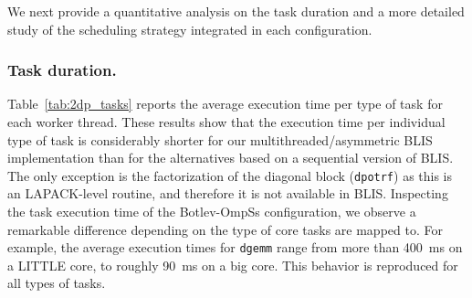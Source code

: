 We next provide a quantitative analysis on the task duration and a more detailed study of 
the scheduling strategy integrated in each configuration.

\subsubsection{Task duration.}
 
Table~\ref{tab:2dp_tasks} reports the average execution time per type of task for each worker thread.
These results show that the execution time per individual type of task is considerably shorter
for our multithreaded/asymmetric BLIS implementation than for the alternatives based on a sequential
version of BLIS. The only exception is the factorization of the diagonal block ({\tt dpotrf}) as this is
an LAPACK-level routine, and therefore it is not available in BLIS. Inspecting the task execution time of
the Botlev-OmpSs configuration, we observe a remarkable difference depending
on the type of core tasks are mapped to. For example, the average execution times for {\tt dgemm}
range from more than 400~ms on a LITTLE core, to roughly 90~ms on a big core. This
behavior is reproduced for all types of tasks.




